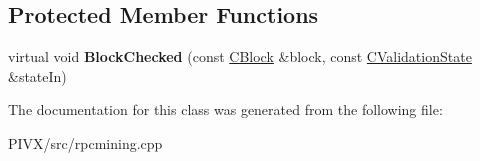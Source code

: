 \subsection*{Protected Member Functions}
\begin{DoxyCompactItemize}
\item 
\mbox{\label{classsubmitblock___state_catcher_a7c7174ac1a54c80c572b115114aa2ee6}} 
virtual void {\bfseries Block\+Checked} (const \mbox{\hyperlink{class_c_block}{C\+Block}} \&block, const \mbox{\hyperlink{class_c_validation_state}{C\+Validation\+State}} \&state\+In)
\end{DoxyCompactItemize}


The documentation for this class was generated from the following file\+:\begin{DoxyCompactItemize}
\item 
P\+I\+V\+X/src/rpcmining.\+cpp\end{DoxyCompactItemize}
